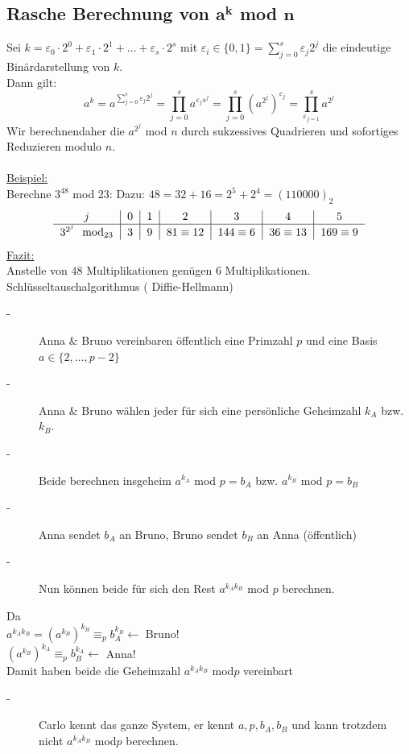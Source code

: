 \subsection{Rasche Berechnung von  $\mathbf{a^{k}}$ mod $\mathbf{n}$}
Sei $k = \varepsilon_{0} \cdot 2^{0} + \varepsilon_{1} \cdot 2^{1} + \dotsc + \varepsilon_{s} \cdot 2^{s}$ mit $\varepsilon_{i} \in \{0,1\} = \sum \limits^{s}_{j = 0} \varepsilon_{j}2^{j}$ die eindeutige Binärdarstellung von  $k$.\\
Dann gilt:
\begin{equation*}
a^{k} = a^{\sum \limits^{s}_{j = 0} \varepsilon_{j}2^{j}} = \prod \limits^{s}_{j = 0} a^{\varepsilon_j s^{j}} = \prod \limits^{s}_{j=0}(a^{2^{j}})^{\varepsilon_j} = \prod \limits^{s}_{\varepsilon_{j = 1}} a^{2^{j}}
\end{equation*}
Wir berechnendaher die $a^{2^{j}}$ mod $n$ durch sukzessives Quadrieren und sofortiges Reduzieren modulo $n$.\\
\qquad\\
\underline{Beispiel:}\\
Berechne $3^{48}$ mod $23$: Dazu: $48 = 32 +16 = 2^{5} + 2^{4} = (110000)_{2}$
\begin{equation*}
	\begin{tabular}{c|c|c|c|c|c|c} 
		$j$ & $0$ & $1$ & $2$ & $3$ & $4$ & $5$ \\\hline 
		$3^{2^{j}}$ \ mod$_{23}$ & $3$ & $9$ & $81\equiv 12$ & $144 \equiv 6$ & $36  \equiv 13$ & $169 \equiv 9$\\
	\end{tabular} 
\end{equation*}
\underline{Fazit:}\\
Anstelle von $48$ Multiplikationen genügen $6$ Multiplikationen. \\
Schlüsseltauschalgorithmus ( Diffie-Hellmann)
\begin{description}
	\item[-] Anna \& Bruno vereinbaren öffentlich eine Primzahl $p$ und eine Basis $a \in \{2,\dotsc, p-2\}$
	\item[-] Anna \& Bruno wählen jeder für sich eine persönliche Geheimzahl $k_{A}$ bzw. $k_{B}$. 
	\item[-] Beide berechnen insgeheim $a^{k_{A}}$ mod $p = b_{A}$ bzw. $a^{k_{B}}$ mod $p=b_{B}$
	\item[-] Anna sendet $b_{A}$ an Bruno, Bruno sendet $b_{B}$ an Anna (öffentlich)
	\item[-] Nun können beide für sich den Rest $a^{k_{A}k_{B}}$ mod $p$ berechnen. 
\end{description}
Da\\
$a^{k_{A}k_{B}} = (a^{k_{B}})^{k_{B}} \equiv_{p} b_{A}^{k_{B}} \leftarrow$ Bruno!\\
$(a^{k_{B}})^{k_{A}} \equiv_{p} b_{B}^{k_{A}} \leftarrow$ Anna!\\
Damit haben beide die Geheimzahl $a^{k_{A}k_{B}}$ mod$p$ vereinbart
\begin{description}
	\item[-] Carlo kennt das ganze System, er kennt $a,p,b_{A},b_{B}$ und kann trotzdem nicht $a^{k_{A}k_{B}}$ mod$p$ berechnen.
\end{description}
%
%
%
